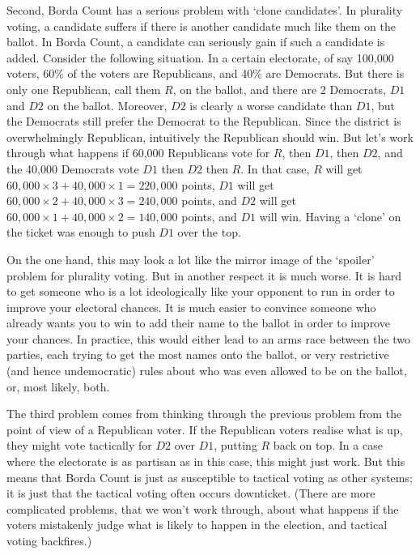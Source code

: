 \documentclass[openany]{book}
\begin{document}
Second, Borda Count has a serious problem with `clone candidates'. In plurality voting, a candidate suffers if there is another candidate much like them on the ballot. In Borda Count, a candidate can seriously gain if such a candidate is added. Consider the following situation. In a certain electorate, of say 100,000 voters, 60\% of the voters are Republicans, and 40\% are Democrats. But there is only one Republican, call them $R$, on the ballot, and there are 2 Democrats, $D1$ and $D2$ on the ballot. Moreover, $D2$ is clearly a worse candidate than $D1$, but the Democrats still prefer the Democrat to the Republican. Since the district is overwhelmingly Republican, intuitively the Republican should win. But let's work through what happens if 60,000 Republicans vote for $R$, then $D1$, then $D2$, and the 40,000 Democrats vote $D1$ then $D2$ then $R$. In that case, $R$ will get $60,000 \times 3 + 40,000 \times 1 = 220,000$ points, $D1$ will get $60,000 \times 2 + 40,000 \times 3 = 240,000$ points, and $D2$ will get $60,000 \times 1 + 40,000 \times 2 = 140,000$ points, and $D1$ will win. Having a `clone' on the ticket was enough to push $D1$ over the top.

On the one hand, this may look a lot like the mirror image of the `spoiler' problem for plurality voting. But in another respect it is much worse. It is hard to get someone who is a lot ideologically like your opponent to run in order to improve your electoral chances. It is much easier to convince someone who already wants you to win to add their name to the ballot in order to improve your chances. In practice, this would either lead to an arms race between the two parties, each trying to get the most names onto the ballot, or very restrictive (and hence undemocratic) rules about who was even allowed to be on the ballot, or, most likely, both.

The third problem comes from thinking through the previous problem from the point of view of a Republican voter. If the Republican voters realise what is up, they might vote tactically for $D2$ over $D1$, putting $R$ back on top. In a case where the electorate is as partisan as in this case, this might just work. But this means that Borda Count is just as susceptible to tactical voting as other systems; it is just that the tactical voting often occurs downticket. (There are more complicated problems, that we won't work through, about what happens if the voters mistakenly judge what is likely to happen in the election, and tactical voting backfires.)
\end{document}
